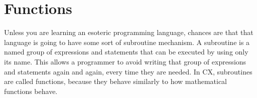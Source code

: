 \documentclass[11pt,fleqn,openany]{book} %
\begin{document}


\chapter{Functions}
\label{chapter:functions}


Unless you are learning an esoteric programming language, chances are that that language is going to have some sort of subroutine mechanism. A subroutine is a named group of expressions and statements that can be executed by using only its name. This allows a programmer to avoid writing that group of expressions and statements again and again, every time they are needed. In CX, subroutines are called functions, because they behave similarly to how mathematical functions behave.
\end{document}
